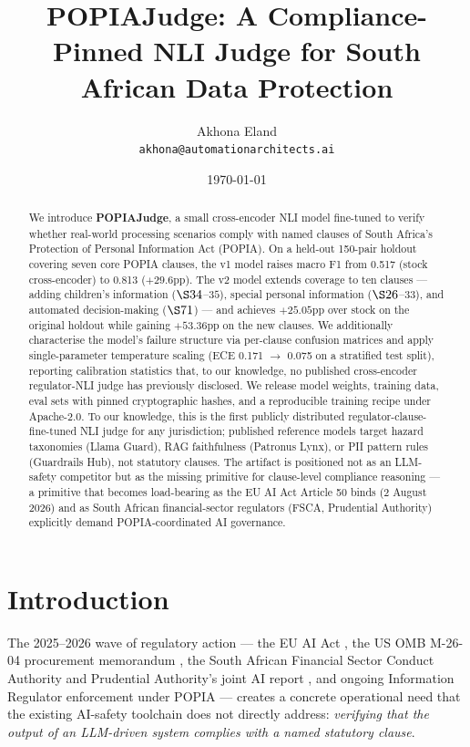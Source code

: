 \documentclass[11pt]{article}
\title{POPIAJudge: A Compliance-Pinned NLI Judge for South African Data Protection}
\author{Akhona Eland \\ \texttt{akhona@automationarchitects.ai}}
\date{\today}
\begin{document}
\maketitle

\begin{abstract}
We introduce \textbf{POPIAJudge}, a small cross-encoder NLI model fine-tuned to verify whether real-world processing scenarios comply with named clauses of South Africa's Protection of Personal Information Act (POPIA). On a held-out 150-pair holdout covering seven core POPIA clauses, the v1 model raises macro F1 from 0.517 (stock cross-encoder) to 0.813 ($+29.6$pp). The v2 model extends coverage to ten clauses --- adding children's information ($\S34$--$35$), special personal information ($\S26$--$33$), and automated decision-making ($\S71$) --- and achieves $+25.05$pp over stock on the original holdout while gaining $+53.36$pp on the new clauses. We additionally characterise the model's failure structure via per-clause confusion matrices and apply single-parameter temperature scaling (ECE 0.171 $\to$ 0.075 on a stratified test split), reporting calibration statistics that, to our knowledge, no published cross-encoder regulator-NLI judge has previously disclosed. We release model weights, training data, eval sets with pinned cryptographic hashes, and a reproducible training recipe under Apache-2.0. To our knowledge, this is the first publicly distributed regulator-clause-fine-tuned NLI judge for any jurisdiction; published reference models target hazard taxonomies (Llama Guard), RAG faithfulness (Patronus Lynx), or PII pattern rules (Guardrails Hub), not statutory clauses. The artifact is positioned not as an LLM-safety competitor but as the missing primitive for clause-level compliance reasoning --- a primitive that becomes load-bearing as the EU AI Act Article 50 binds (2 August 2026) and as South African financial-sector regulators (FSCA, Prudential Authority) explicitly demand POPIA-coordinated AI governance.
\end{abstract}

\section{Introduction}
\label{sec:intro}

The 2025--2026 wave of regulatory action --- the EU AI Act \cite{eu-ai-act}, the US OMB M-26-04 procurement memorandum \cite{omb-m-26-04}, the South African Financial Sector Conduct Authority and Prudential Authority's joint AI report \cite{fsca-pa-2025}, and ongoing Information Regulator enforcement under POPIA \cite{popia} --- creates a concrete operational need that the existing AI-safety toolchain does not directly address: \emph{verifying that the output of an LLM-driven system complies with a named statutory clause}.
\end{document}
